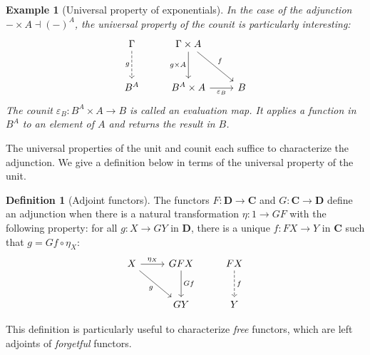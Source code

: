 \documentclass[11pt,oneside,draft]{book}
\newtheorem{example}[theorem]{Example}
\theoremstyle{definition}
\newtheorem{definition}[theorem]{Definition}
\begin{document}
\begin{example}[Universal property of exponentials] \label{ex:upexp} %
In the case of the adjunction $- \times A \dashv (-)^A$,
the universal property of the counit
is particularly interesting:
\[
  \begin{tikzcd}[row sep=large]
    \Gamma
      \ar[d, "g"', dashed] &
    \Gamma \times A
      \ar[d, "g \times A"']
      \ar[dr, "f"] &
    \\
    B^A &
    B^A \times A
      \ar[r, "\varepsilon_B"'] &
    B
  \end{tikzcd}
\]
The counit $\varepsilon_B : B^A \times A \rightarrow B$
is called an \emph{evaluation map}.
It applies a function in $B^A$ to an element of $A$
and returns the result in $B$.
\end{example}

The universal properties
of the unit and counit
each suffice to characterize the adjunction.
We give a definition below
in terms of the universal property of the unit.

\begin{definition}[Adjoint functors] \label{def:adj} %
The functors $F : \mathbf{D} \rightarrow \mathbf{C}$
and $G : \mathbf{C} \rightarrow \mathbf{D}$
define an adjunction
when there is a natural transformation
$\eta : 1 \rightarrow GF$
with the following property:
for all $g : X \rightarrow G Y$ in $\mathbf{D}$,
there is a unique $f : F X \rightarrow Y$ in $\mathbf{C}$
such that $g = G f \circ \eta_X$:
\[
  \begin{tikzcd}[row sep=large]
    X \ar[r, "\eta_X"] \ar[dr, "g"'] &
    G F X \ar[d, "G f"] &
    F X \ar[d, "f", dashed]
    \\ &
    G Y & Y
  \end{tikzcd}
\]
\end{definition}

This definition is particularly useful
to characterize \emph{free} functors,
which are left adjoints
of \emph{forgetful} functors.
\end{document}
